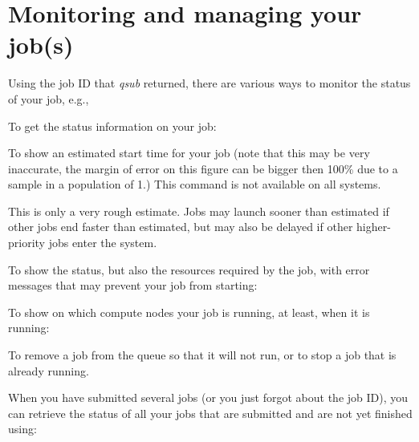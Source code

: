 \section{Monitoring and managing your job(s)}

Using the job ID that \textit{qsub} returned, there are various ways to monitor
the status of your job, e.g.,

To get the status information on your job:

\begin{prompt}
\end{prompt}

\ifgent
\else
  To show an estimated start time for your job (note that this may be very inaccurate,
  the margin of error on this figure can be bigger then 100\% due to a sample in a
  population of 1.)
  This command is not available on all systems.
  
  \begin{prompt}
  \end{prompt}
  
  This is only a very rough estimate. Jobs may launch sooner than estimated if
  other jobs end faster than estimated, but may also be delayed if other
  higher-priority jobs enter the system.
  
  To show the status, but also the resources required by the job, with error
  messages that may prevent your job from starting:
  
  \begin{prompt}
  \end{prompt}
\fi

To show on which compute nodes your job is running, at least, when it is
running:

\begin{prompt}
\end{prompt}

To remove a job from the queue so that it will not run, or to stop a job that
is already running.

\begin{prompt}
\end{prompt}

When you have submitted several jobs (or you just forgot about the job ID), you
can retrieve the status of all your jobs that are submitted and are not yet
finished using:

